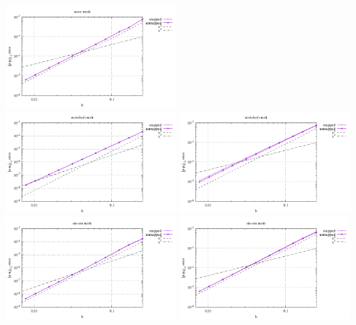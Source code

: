 \begin{center}
\includegraphics[width=6.5cm]{python_codes/fieldstone_76/results/bench1/straight/errors_P_mt3.pdf}\\
\includegraphics[width=6.5cm]{python_codes/fieldstone_76/results/bench1/straight/errors_V_mt4.pdf}
\includegraphics[width=6.5cm]{python_codes/fieldstone_76/results/bench1/straight/errors_P_mt4.pdf}\\
\includegraphics[width=6.5cm]{python_codes/fieldstone_76/results/bench1/straight/errors_V_mt5.pdf}
\includegraphics[width=6.5cm]{python_codes/fieldstone_76/results/bench1/straight/errors_P_mt5.pdf}\\

\end{center}
